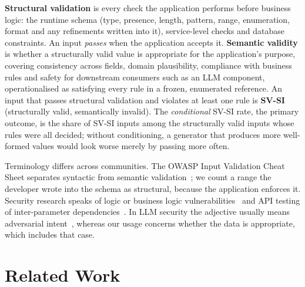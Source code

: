 \documentclass[journal]{IEEEtran}
\begin{document}
\textbf{Structural validation} is every check the application performs before business logic: the
runtime schema (type, presence, length, pattern, range, enumeration, format and any refinements written
into it), service-level checks and database constraints. An input \emph{passes} when the application
accepts it. \textbf{Semantic validity} is whether a structurally valid value is appropriate for the
application's purpose, covering consistency across fields, domain plausibility, compliance with
business rules and safety for downstream consumers such as an LLM component, operationalised as
satisfying every rule in a frozen, enumerated reference. An input that passes structural validation and
violates at least one rule is \textbf{SV-SI} (structurally valid, semantically invalid). The
\emph{conditional} SV-SI rate, the primary outcome, is the share of SV-SI inputs among the structurally
valid inputs whose rules were all decided; without conditioning, a generator that produces more
well-formed values would look worse merely by passing more often.

Terminology differs across communities. The OWASP Input Validation Cheat Sheet separates syntactic from
semantic validation~\cite{owasp2026inputvalidation}; we count a range the developer wrote into the schema
as structural, because the application enforces it. Security research speaks of logic or business logic
vulnerabilities~\cite{felmetsger2010waler,pellegrino2014logicflaws,metin2025blv} and API testing of
inter-parameter dependencies~\cite{martinlopez2022idl,martinlopez2019catalogue}. In LLM security the
adjective usually means adversarial intent~\cite{singh2026injectioninteraction}, whereas our usage
concerns whether the data is appropriate, which includes that case.

\section{Related Work}
\label{sec:related}
\end{document}
